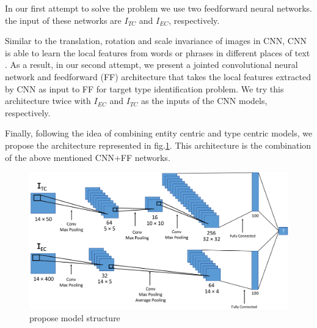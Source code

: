 In our first attempt to solve the problem we use two feedforward neural networks. the input of these networks are $I_{TC}$ and $I_{EC}$, respectively.


Similar to the translation, rotation and scale invariance of images in CNN, CNN is able to learn the local features from words or phrases in different places of text \cite{wang2016combination}. As a result, in our second attempt, we present a jointed convolutional neural network and feedforward (FF) architecture that takes the local features extracted by CNN as input to FF for target type identification problem. We try this architecture twice with $I_{EC}$ and $I_{TC}$ as the inputs of the CNN models, respectively.

Finally, following the idea of combining entity centric and type centric models\cite{Balog:2011:QME:2037661.2037667,Garigliotti:2017:TTI:3077136.3080659}, we propose the architecture represented in fig.\ref{proposeModel}. This architecture is the combination of the above mentioned CNN+FF networks.
\begin{figure}
	\includegraphics[width=\textwidth]{model_vis1.pdf} \caption{propose model structure}\label{proposeModel}
\end{figure}
